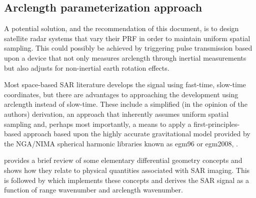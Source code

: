 \subsection{Arclength parameterization approach}
A potential solution, and the recommendation of this document, is to design satellite radar systems that vary their PRF in order to maintain uniform spatial sampling. This could possibly be achieved by triggering pulse transmission based upon a device that not only measures arclength through inertial measurements but also adjusts for non-inertial earth rotation effects.
\par 
Most space-based SAR literature develops the signal using fast-time, slow-time coordinates, but there are advantages to approaching the development using arclength instead of slow-time. These include a simplified (in the opinion of the authors) derivation, an approach that inherently assumes uniform spatial sampling and, perhaps most importantly, a means to apply a first-principles-based approach based upon the highly accurate gravitational model provided by the NGA/NIMA spherical harmonic libraries known as egm96 or egm2008, \cite{NASAEGM86}.
\par
{} provides a brief review of some elementary differential geometry concepts and shows how they relate to physical quantities associated with SAR imaging. This is followed by  which implements these concepts and derives the SAR signal as a function of range wavenumber and arclength wavenumber.
\clearpage
